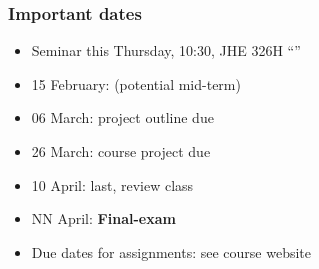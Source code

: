 \begin{frame}\frametitle{Important dates}
	\begin{itemize}
		\item	Seminar this Thursday, 10:30, JHE 326H ``\emph{{\color{myGreen}{Six Sigma for Chemical Engineers}}}''
		\item	15 February: (potential mid-term)
		\item	06 March: project outline due 
		\item	26 March: course project due
		\item	10 April: last, review class
		\item	NN April: \textbf{Final-exam }
	\end{itemize}
	\begin{itemize}
		\item	Due dates for assignments: see course website 
	\end{itemize}
\end{frame}